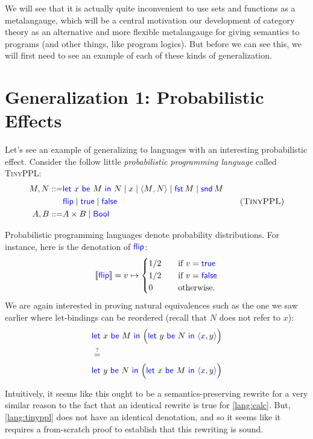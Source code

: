 We will see that it is actually quite inconvenient to use sets and functions as a metalangauge, 
which will be a central motivation our development of category theory as an alternative 
and more flexible metalangauge for giving semantics to programs (and other things, like 
program logics).
But before we can see this,
we will first need to see an example of each of these kinds of generalization.

\section{Generalization 1: Probabilistic Effects}
Let's see an example of generalizing to languages with an interesting probabilistic 
effect. Consider the follow little \emph{probabilistic programming language} called
\textsc{TinyPPL}:
\begin{gather}
  \begin{aligned}
  M,N ::=& \pllet{x}{M}{N} \mid x \mid \plpair{M}{N} \mid \plfst{M} \mid \plsnd{M} \\
   & \plflip{} \mid \pltrue{} \mid \plfalse{}  \\
  A,B ::=& A \times B \mid \plBool
  \end{aligned}
  \tag{\textsc{TinyPPL}}
  \label{lang:tinyppl}
\end{gather}

Probabilistic programming languages denote probability distributions. For instance,
here is the denotation of $\mathsf{{\color{blue}flip}}{}$:
\begin{align*}
  \left\llbracket \mathsf{{\color{blue}flip}}{} \right\rrbracket = v \mapsto 
  \begin{cases}
    1/2 \quad& \text{if }v=\mathsf{{\color{blue}true}}\\
    1/2 \quad& \text{if }v=\mathsf{{\color{blue}false}}\\
    0 \quad& \text{otherwise.}
  \end{cases}
\end{align*}
We are again interested in proving natural equivalences such as the one 
we saw earlier where let-bindings can be reordered (recall that 
$N$ does not refer to $x$):
\begin{align*}
  &\pllet{x}{M}{\Big( \pllet{y}{N}{\plpair{x}{y}} \Big)}\\
  &\stackrel{?}{=}\\
  &\pllet{y}{N}{\Big( \pllet{x}{M}{\plpair{x}{y}} \Big)}
\end{align*}

Intuitively, it seems like this ought to be a semantics-preserving rewrite for a
very similar reason to the fact that an identical rewrite is true for
\ref{lang:calc}. But, \ref{lang:tinyppl} does not have an identical denotation,
and so it seems like it requires a from-scratch proof to establish that 
this rewriting is sound.

